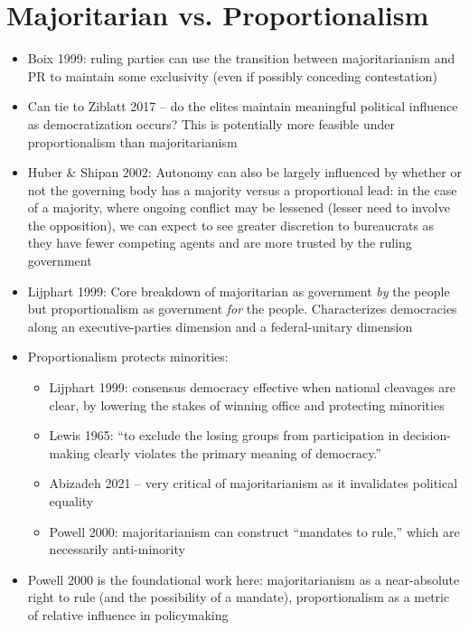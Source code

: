 \documentclass[12pt]{article}
\begin{document}
\section*{Majoritarian vs. Proportionalism}


\begin{itemize}
    \item Boix 1999: ruling parties can use the transition between majoritarianism and PR to maintain some exclusivity (even if possibly conceding contestation)
    \item Can tie to Ziblatt 2017 -- do the elites maintain meaningful political influence as democratization occurs? This is potentially more feasible under proportionalism than majoritarianism
    \item Huber \& Shipan 2002: Autonomy can also be largely influenced by whether or not the governing body has a majority versus a proportional lead: in the case of a majority, where ongoing conflict may be lessened (lesser need to involve the opposition), we can expect to see greater discretion to bureaucrats as they have fewer competing agents and are more trusted by the ruling government
    \item Lijphart 1999: Core breakdown of majoritarian as government \emph{by} the people but proportionalism as government \emph{for} the people. Characterizes democracies along an executive-parties dimension and a federal-unitary dimension
    \item Proportionalism protects minorities:
    \begin{itemize}
        \item Lijphart 1999: consensus democracy effective when national cleavages are clear, by lowering the stakes of winning office and protecting minorities
        \item Lewis 1965: ``to exclude the losing groups from participation in decision-making clearly violates the primary meaning of democracy.''
        \item Abizadeh 2021 -- very critical of majoritarianism as it invalidates political equality
        \item Powell 2000: majoritarianism can construct ``mandates to rule,'' which are necessarily anti-minority
    \end{itemize}
    \item Powell 2000 is the foundational work here: majoritarianism as a near-absolute right to rule (and the possibility of a mandate), proportionalism as a metric of relative influence in policymaking
    \begin{itemize}

\end{itemize}
\end{itemize}
\end{document}
